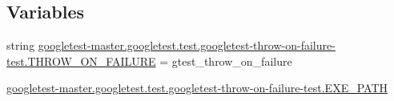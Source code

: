 \subsection*{Variables}
\begin{DoxyCompactItemize}
\item 
string \mbox{\hyperlink{namespacegoogletest-master_1_1googletest_1_1test_1_1googletest-throw-on-failure-test_a3742eb22b5b357f211b5271d4a908a49}{googletest-\/master.\+googletest.\+test.\+googletest-\/throw-\/on-\/failure-\/test.\+T\+H\+R\+O\+W\+\_\+\+O\+N\+\_\+\+F\+A\+I\+L\+U\+RE}} = \textquotesingle{}gtest\+\_\+throw\+\_\+on\+\_\+failure\textquotesingle{}
\item 
\mbox{\hyperlink{namespacegoogletest-master_1_1googletest_1_1test_1_1googletest-throw-on-failure-test_a6ca5a3e10a7b8ea2707dc7bd41c3d131}{googletest-\/master.\+googletest.\+test.\+googletest-\/throw-\/on-\/failure-\/test.\+E\+X\+E\+\_\+\+P\+A\+TH}}
\end{DoxyCompactItemize}
